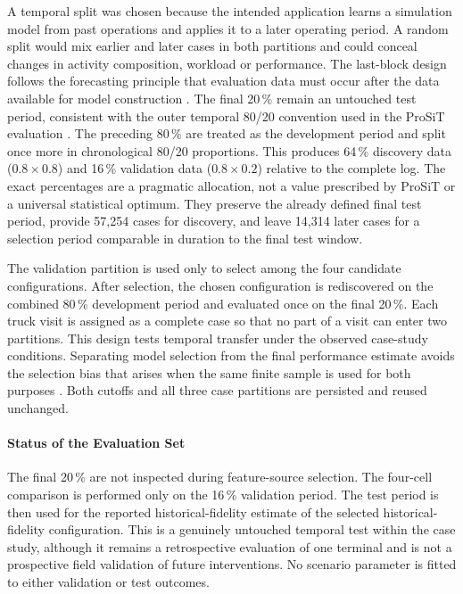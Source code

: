 A temporal split was chosen because the intended application learns a
simulation model from past operations and applies it to a later operating
period. A random split would mix earlier and later cases in both partitions and
could conceal changes in activity composition, workload or performance. The
last-block design follows the forecasting principle that evaluation data must
occur after the data available for model construction
\cite{BergmeirBenitez2012}. The final 20\,\% remain an untouched test period,
consistent with the outer temporal 80/20 convention used in the ProSiT
evaluation \cite{Vinci2026prosit}. The preceding 80\,\% are treated as the
development period and split once more in chronological 80/20 proportions.
This produces 64\,\% discovery data ($0.8\times0.8$) and 16\,\% validation data
($0.8\times0.2$) relative to the complete log. The exact percentages are a
pragmatic allocation, not a value prescribed by ProSiT or a universal
statistical optimum. They preserve the already defined final test period,
provide 57,254 cases for discovery, and leave 14,314 later cases for a
selection period comparable in duration to the final test window.

The validation partition is used only to select among the four candidate
configurations. After selection, the chosen configuration is
rediscovered on the combined 80\,\% development period and evaluated once on
the final 20\,\%. Each truck visit is assigned as a complete case so that no
part of a visit can enter two partitions. This design tests temporal transfer
under the observed case-study conditions. Separating model selection from the
final performance estimate avoids the selection bias that arises when the same
finite sample is used for both purposes
\cite{CawleyTalbot2010,ChapelaCampa2023Trust,Ozdemir2025UtilityBPS,vinci2025onlinediscoverysimulationmodels}.
Both cutoffs and all three case partitions are persisted and reused unchanged.

\paragraph{Status of the Evaluation Set}

The final 20\,\% are not inspected during feature-source selection. The
four-cell comparison is performed only on the 16\,\% validation period. The
test period is then used for the reported historical-fidelity estimate of the
selected historical-fidelity configuration. This is a genuinely untouched temporal test
within the case study, although it remains a retrospective evaluation of one
terminal and is not a prospective field validation of future interventions.
No scenario parameter is fitted to either validation or test outcomes.

